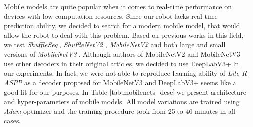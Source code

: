 Mobile models are quite popular when it comes to real-time performance on devices
with low computation resources. Since our robot lacks real-time prediction ability,
we decided to search for a modern mobile model, that would allow the robot to deal
with this problem. Based on previous works in this field, we test \textit{ShuffleSeg}
\cite{bib:gamal2018shuffleseg}, \textit{ShuffleNetV2} \cite{bib:turkmen2019efficient},
\textit{MobileNetV2} \cite{bib:sandler2018mobilenetv2} and both large and small versions
of \textit{MobileNetV3} \cite{bib:howard2019searching}. Although authors of MobileNetV2 and
MobileNetV3 use other decoders in their original articles, we decided to use DeepLabV3+ 
\cite{bib:chen2018encoder} in our experiments. In fact, we were not able to reproduce
learning ability of \textit{Lite R-ASPP} as a decoder proposed for MobileNetV3 and
DeepLabV3+ seems like a good fit for our purposes. In Table \ref{tab:mobilenets_desc}
we present architecture and hyper-parameters of mobile models. All model variations are 
trained using \textit{Adam} optimizer and the training procedure took from 25 to 40 minutes in
all cases.

